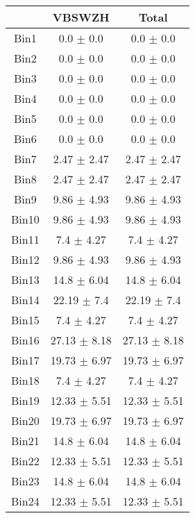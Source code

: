   \begin{tabular}{|c|c|c|}
  \hline
      & VBSWZH & Total \\ \cline{1-3} 
     \hline\hline
     Bin1 & 0.0 $\pm$ 0.0 & 0.0 $\pm$ 0.0 \\ \cline{1-3} 
     Bin2 & 0.0 $\pm$ 0.0 & 0.0 $\pm$ 0.0 \\ \cline{1-3} 
     Bin3 & 0.0 $\pm$ 0.0 & 0.0 $\pm$ 0.0 \\ \cline{1-3} 
     Bin4 & 0.0 $\pm$ 0.0 & 0.0 $\pm$ 0.0 \\ \cline{1-3} 
     Bin5 & 0.0 $\pm$ 0.0 & 0.0 $\pm$ 0.0 \\ \cline{1-3} 
     Bin6 & 0.0 $\pm$ 0.0 & 0.0 $\pm$ 0.0 \\ \cline{1-3} 
     Bin7 & 2.47 $\pm$ 2.47 & 2.47 $\pm$ 2.47 \\ \cline{1-3} 
     Bin8 & 2.47 $\pm$ 2.47 & 2.47 $\pm$ 2.47 \\ \cline{1-3} 
     Bin9 & 9.86 $\pm$ 4.93 & 9.86 $\pm$ 4.93 \\ \cline{1-3} 
     Bin10 & 9.86 $\pm$ 4.93 & 9.86 $\pm$ 4.93 \\ \cline{1-3} 
     Bin11 & 7.4 $\pm$ 4.27 & 7.4 $\pm$ 4.27 \\ \cline{1-3} 
     Bin12 & 9.86 $\pm$ 4.93 & 9.86 $\pm$ 4.93 \\ \cline{1-3} 
     Bin13 & 14.8 $\pm$ 6.04 & 14.8 $\pm$ 6.04 \\ \cline{1-3} 
     Bin14 & 22.19 $\pm$ 7.4 & 22.19 $\pm$ 7.4 \\ \cline{1-3} 
     Bin15 & 7.4 $\pm$ 4.27 & 7.4 $\pm$ 4.27 \\ \cline{1-3} 
     Bin16 & 27.13 $\pm$ 8.18 & 27.13 $\pm$ 8.18 \\ \cline{1-3} 
     Bin17 & 19.73 $\pm$ 6.97 & 19.73 $\pm$ 6.97 \\ \cline{1-3} 
     Bin18 & 7.4 $\pm$ 4.27 & 7.4 $\pm$ 4.27 \\ \cline{1-3} 
     Bin19 & 12.33 $\pm$ 5.51 & 12.33 $\pm$ 5.51 \\ \cline{1-3} 
     Bin20 & 19.73 $\pm$ 6.97 & 19.73 $\pm$ 6.97 \\ \cline{1-3} 
     Bin21 & 14.8 $\pm$ 6.04 & 14.8 $\pm$ 6.04 \\ \cline{1-3} 
     Bin22 & 12.33 $\pm$ 5.51 & 12.33 $\pm$ 5.51 \\ \cline{1-3} 
     Bin23 & 14.8 $\pm$ 6.04 & 14.8 $\pm$ 6.04 \\ \cline{1-3} 
     Bin24 & 12.33 $\pm$ 5.51 & 12.33 $\pm$ 5.51 \\ \cline{1-3} 

\end{tabular}
